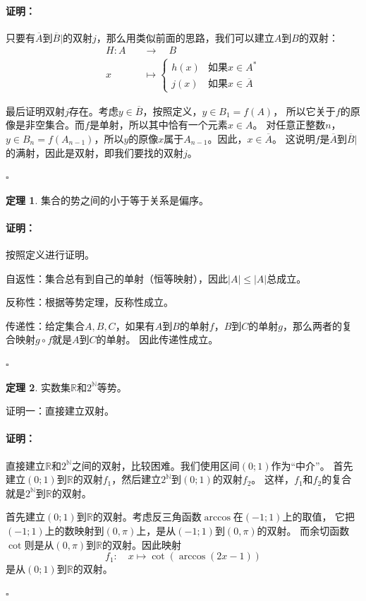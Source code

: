 \documentclass[12pt,UTF8]{ctexbook}
\theoremstyle{definition}
\newtheorem{tm}{定理}[section]
\theoremstyle{plain}
\renewenvironment{proof}{\paragraph{\textbf{证明：}}}{\hfill$\square$}
\begin{document}
\begin{appendix}
\begin{proof}
    只要有$\overline{A}$到$\overline{B}|$的双射$j$，那么用类似前面的思路，我们可以建立$A$到$B$的双射：
    \begin{align*}
        H : A \quad&\rightarrow \quad B  \\
        x \quad&\mapsto \left\{ \begin{array}{ll}
            h(x) & \mbox{如果} x\in A^*  \\
            j(x) & \mbox{如果} x\in \overline{A}
        \end{array} \right.
    \end{align*}

    最后证明双射$j$存在。考虑$y \in \overline{B}$，按照定义，$y\in B_1 = f(A)$，
    所以它关于$f$的原像是非空集合。而$f$是单射，所以其中恰有一个元素$x\in A$。
    对任意正整数$n$，$y\in B_n = f(A_{n-1})$，所以$y$的原像$x$属于$A_{n-1}$。因此，$x\in \overline{A}$。
    这说明$f$是$\overline{A}$到$\overline{B}|$的满射，因此是双射，即我们要找的双射$j$。

\end{proof}

\begin{tm}
    集合的势之间的小于等于关系是偏序。
\end{tm}

\begin{proof}
    按照定义进行证明。
    
    自返性：集合总有到自己的单射（恒等映射），因此$|A| \leqslant |A|$总成立。

    反称性：根据等势定理，反称性成立。

    传递性：给定集合$A,B,C$，如果有$A$到$B$的单射$f$，$B$到$C$的单射$g$，那么两者的复合映射$g\circ f$就是$A$到$C$的单射。
    因此传递性成立。

\end{proof}

\begin{tm}
    实数集$\mathbb{R}$和$2^\mathbb{N}$等势。
\end{tm}

证明一：直接建立双射。

\begin{proof}
    直接建立$\mathbb{R}$和$2^\mathbb{N}$之间的双射，比较困难。我们使用区间$(0;1)$作为“中介”。
    首先建立$(0;1)$到$\mathbb{R}$的双射$f_1$，然后建立$2^\mathbb{N}$到$(0;1)$的双射$f_2$。
    这样，$f_1$和$f_2$的复合就是$2^\mathbb{N}$到$\mathbb{R}$的双射。
    
    首先建立$(0;1)$到$\mathbb{R}$的双射。考虑反三角函数$\arccos$在$(-1;1)$上的取值，
    它把$(-1;1)$上的数映射到$(0,\pi)$上，是从$(-1;1)$到$(0,\pi)$的双射。
    而余切函数$\cot$则是从$(0,\pi)$到$\mathbb{R}$的双射。因此映射
    $$ f_1 :\quad x \mapsto \cot{\left(\arccos{(2x-1)}\right)} $$
    是从$(0;1)$到$\mathbb{R}$的双射。


\end{proof}
\end{appendix}
\end{document}
